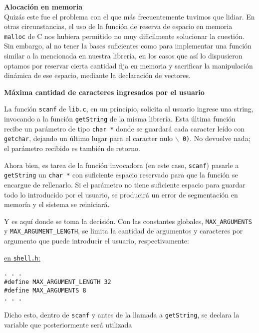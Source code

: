 \documentclass[a4paper,10pt]{article}
\begin{document}
\textbf{\large{Alocación en memoria}}\\
\indent Quizás este fue el problema con el que más frecuentemente tuvimos que lidiar. En otras circunstancias, el uso de la
función de reserva de espacio en memoria \texttt{malloc} de C nos hubiera permitido no muy dificilmente solucionar la cuestión.
Sin embargo, al no tener la bases suficientes como para implementar una función similar a la mencionada en nuestra librería,
en los casos que así lo dispusieron optamos por reservar cierta cantidad fija en memoria y sacrificar la
manipulación dinámica de ese espacio, mediante la declaración de vectores.\par \noindent \newline
\indent \textbf{Máxima cantidad de caracteres ingresados por el usuario}\par
La función \texttt{scanf} de \texttt{lib.c}, en un principio, solicita al usuario ingrese una string, invocando a la función
\texttt{getString} de la misma librería. Esta última función recibe un parámetro de tipo \texttt{char *} donde se guardará
cada caracter leído con \texttt{getchar}, dejando un último lugar para el caracter nulo \texttt{$\backslash$ 0)}. 
No devuelve nada; el parámetro
recibido es también de retorno.\par \noindent \newline
\indent Ahora bien, es tarea de la función invocadora (en este caso, \texttt{scanf}) pasarle a \texttt{getString} un \texttt{char *} con suficiente
espacio reservado para que la función se encargue de rellenarlo. Si el parámetro no tiene suficiente espacio para guardar
todo lo introducido por el usuario, se producirá un error de segmentación en memoría y el sistema se reiniciará.
\par \noindent \newline
\indent Y es aquí donde se toma la decisión. Con las constantes globales, \texttt{MAX\_ARGUMENTS} y \texttt{MAX\_ARGUMENT\_LENGTH},
se limita la cantidad de argumentos y caracteres por argumento que puede introducir el usuario, respectivamente:\par \noindent
\newline \newline \underline{en \texttt{shell.h}:}
\begin{verbatim}
. . .
#define MAX_ARGUMENT_LENGTH 32
#define MAX_ARGUMENTS 8
. . .
\end{verbatim}
\par Dicho esto, dentro de \texttt{scanf} y antes de la llamada a \texttt{getString}, se declara la variable que posteriormente será utilizada
\end{document}
